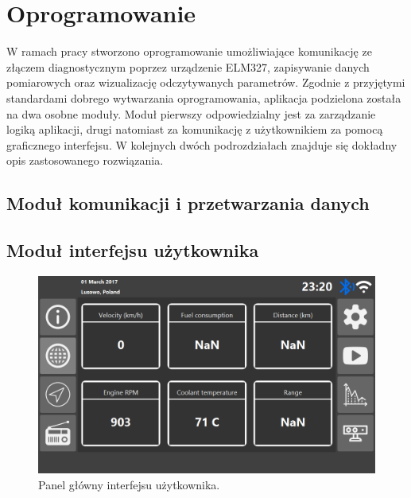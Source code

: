 \documentclass[12pt]{article} %
\numberwithin{equation}{subsection}
\numberwithin{figure}{section}
\numberwithin{table}{section}
\begin{document}
		\newpage
		
		
	
		\newpage


\section{Oprogramowanie}

\hspace{0.5cm}W ramach pracy stworzono oprogramowanie umożliwiające komunikację ze złączem diagnostycznym poprzez urządzenie ELM327, zapisywanie danych pomiarowych oraz wizualizację odczytywanych parametrów. Zgodnie z przyjętymi standardami dobrego wytwarzania oprogramowania, aplikacja podzielona została na dwa osobne moduły. Moduł pierwszy odpowiedzialny jest za zarządzanie logiką aplikacji, drugi natomiast za komunikację z użytkownikiem za pomocą graficznego interfejsu. W kolejnych dwóch podrozdziałach znajduje się dokładny opis zastosowanego rozwiązania.

	
\subsection{Moduł komunikacji i przetwarzania danych}\label{rozdzial_raspberry_software}
	\hspace{0.5cm}
	
	\newpage
	
	
\subsection{Moduł interfejsu użytkownika}\label{rozdzial_hmi_software}
	\hspace{0.5cm}
	
	\begin{figure}[!h]
			\centering
			\includegraphics[scale=0.5]{Images/user_interface_dashboard.png}
			\caption{Panel główny interfejsu użytkownika.}
			\label{user_interface_dashboard}
		\end{figure}
		
\end{document}
